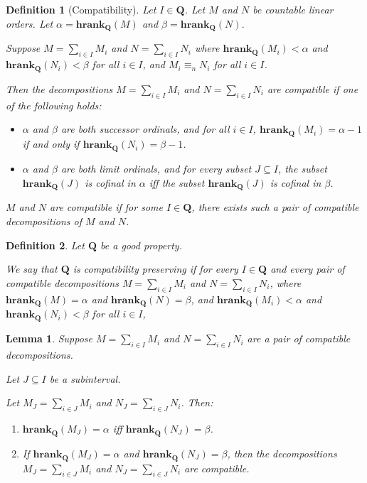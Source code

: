 \documentclass{article}
\newtheorem{lemma}{Lemma}
\newtheorem{definition}{Definition}
\newcommand{\hrank}[1]{\mathbf{hrank}_{\qq}\left( #1 \right)}
\newcommand{\qq}{\mathbf{Q}}
\begin{document}
\begin{definition}[Compatibility]
  Let $I \in \qq$.
  Let $M$ and $N$ be countable linear orders.
  Let $\alpha = \hrank{M}$ and $\beta = \hrank{N}$.

  Suppose $M = \sum_{i \in I} M_i$ and $N = \sum_{i \in I} N_i$ where
  $\hrank{M_i} < \alpha$ and $\hrank{N_i} < \beta$ for all $i \in I$,
  and $M_i \equiv_n N_i$ for all $i \in I$.

  Then the decompositions $M = \sum_{i \in I} M_i$ and $N = \sum_{i \in I} N_i$ are \emph{compatible} if one of the following holds:

  \begin{itemize}
    \item $\alpha$ and $\beta$ are both successor ordinals,
          and for all $i \in I$, $\hrank{M_i} = \alpha - 1$
          if and only if $\hrank{N_i} = \beta - 1$.
    \item $\alpha$ and $\beta$ are both limit ordinals,
          and for every subset $J \subseteq I$,
          the subset $\hrank{J}$ is cofinal in $\alpha$
          iff the subset $\hrank{J}$ is cofinal in $\beta$.
  \end{itemize}

  $M$ and $N$ are \emph{compatible} if for some $I \in \qq$,
  there exists such a pair of compatible decompositions of $M$ and $N$.
\end{definition}

\begin{definition}
  Let $\qq$ be a good property.

  We say that $\qq$ is \emph{compatibility preserving} if
  for every $I \in \qq$ and every pair of compatible decompositions
  $M = \sum_{i \in I} M_i$ and $N = \sum_{i \in I} N_i$,
  where $\hrank{M} = \alpha$ and $\hrank{N} = \beta$,
  and $\hrank{M_i} < \alpha$ and $\hrank{N_i} < \beta$ for all $i \in I$,

\end{definition}

\begin{lemma}
  Suppose $M = \sum_{i \in I} M_i$ and $N = \sum_{i \in I} N_i$ are 
  a pair of compatible decompositions.
  
  Let $J \subseteq I$ be a subinterval.
  
  Let $M_J = \sum_{i \in J} M_i$ and $N_J = \sum_{i \in J} N_i$. Then:

  \begin{enumerate}
    \item $\hrank{M_J} = \alpha$ iff $\hrank{N_J} = \beta$.
    \item If $\hrank{M_J} = \alpha$ and $\hrank{N_J} = \beta$,
          then the decompositions 
          $M_J = \sum_{i \in J} M_i$ and $N_J = \sum_{i \in J} N_i$ are compatible.
  \end{enumerate}
\end{lemma}
\end{document}
